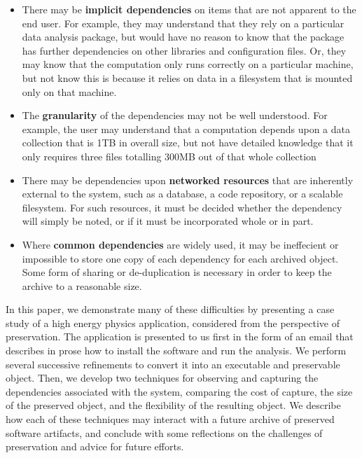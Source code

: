 \documentclass{acm_proc_article-sp}
\begin{document}
\begin{itemize}
\item There may be {\bf implicit dependencies} on items that are
not apparent to the end user.  For example, they may understand that
they rely on a particular data analysis package, but would have
no reason to know that the package has further dependencies on
other libraries and configuration files.  Or, they may know that
the computation only runs correctly on a particular machine, but
not know this is because it relies on data in a filesystem that
is mounted only on that machine.

\item The {\bf granularity} of the dependencies may not be well understood.
For example, the user may understand that a computation depends upon
a data collection that is 1TB in overall size, but not have detailed
knowledge that it only requires three files totalling 300MB out of that
whole collection

\item There may be dependencies upon {\bf networked resources} that
are inherently external to the system, such as a database, a code
repository, or a scalable filesystem.  For such resources, it
must be decided whether the dependency will simply be noted, or if it
must be incorporated whole or in part.

\item Where {\bf common dependencies} are widely used, it may be ineffecient or
impossible to store one copy of each dependency for each archived object.
Some form of sharing or de-duplication is necessary in order to keep
the archive to a reasonable size.
\end{itemize}

In this paper, we demonstrate many of these difficulties by presenting
a case study of a high energy physics application, considered from
the perspective of preservation.  The application is presented to us
first in the form of an email that describes in prose how to install
the software and run the analysis.  We perform several successive
refinements to convert it into an executable and preservable object.
Then, we develop two techniques for observing and capturing the
dependencies associated with the system, comparing the cost of capture,
the size of the preserved object, and the flexibility of the resulting
object.  We describe how each of these techniques may interact with
a future archive of preserved software artifacts, and conclude with
some reflections on the challenges of preservation and advice for future efforts.
\end{document}
